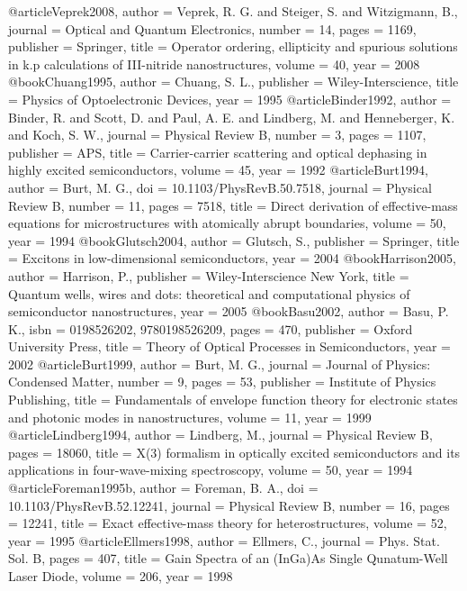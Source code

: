 @article{Veprek2008,
author = {Veprek, R. G. and Steiger, S. and Witzigmann, B.},
journal = {Optical and Quantum Electronics},
number = {14},
pages = {1169},
publisher = {Springer},
title = {{Operator ordering, ellipticity and spurious solutions in k.p calculations of III-nitride nanostructures}},
volume = {40},
year = {2008}
}
@book{Chuang1995,
author = {Chuang, S. L.},
publisher = {Wiley-Interscience},
title = {{Physics of Optoelectronic Devices}},
year = {1995}
}
@article{Binder1992,
author = {Binder, R. and Scott, D. and Paul, A. E. and Lindberg, M. and Henneberger, K. and Koch, S. W.},
journal = {Physical Review B},
number = {3},
pages = {1107},
publisher = {APS},
title = {{Carrier-carrier scattering and optical dephasing in highly excited semiconductors}},
volume = {45},
year = {1992}
}
@article{Burt1994,
author = {Burt, M. G.},
doi = {10.1103/PhysRevB.50.7518},
journal = {Physical Review B},
number = {11},
pages = {7518},
title = {{Direct derivation of effective-mass equations for microstructures with atomically abrupt boundaries}},
volume = {50},
year = {1994}
}
@book{Glutsch2004,
author = {Glutsch, S.},
publisher = {Springer},
title = {{Excitons in low-dimensional semiconductors}},
year = {2004}
}
@book{Harrison2005,
author = {Harrison, P.},
publisher = {Wiley-Interscience New York},
title = {{Quantum wells, wires and dots: theoretical and computational physics of semiconductor nanostructures}},
year = {2005}
}
@book{Basu2002,
author = {Basu, P. K.},
isbn = {0198526202, 9780198526209},
pages = {470},
publisher = {Oxford University Press},
title = {{Theory of Optical Processes in Semiconductors}},
year = {2002}
}
@article{Burt1999,
author = {Burt, M. G.},
journal = {Journal of Physics: Condensed Matter},
number = {9},
pages = {53},
publisher = {Institute of Physics Publishing},
title = {{Fundamentals of envelope function theory for electronic states and photonic modes in nanostructures}},
volume = {11},
year = {1999}
}
@article{Lindberg1994,
author = {Lindberg, M.},
journal = {Physical Review B},
pages = {18060},
title = {{X(3) formalism in optically excited semiconductors and its applications in four-wave-mixing spectroscopy}},
volume = {50},
year = {1994}
}
@article{Foreman1995b,
author = {Foreman, B. A.},
doi = {10.1103/PhysRevB.52.12241},
journal = {Physical Review B},
number = {16},
pages = {12241},
title = {{Exact effective-mass theory for heterostructures}},
volume = {52},
year = {1995}
}
@article{Ellmers1998,
author = {Ellmers, C.},
journal = {Phys. Stat. Sol. B},
pages = {407},
title = {{Gain Spectra of an (InGa)As Single Qunatum-Well Laser Diode}},
volume = {206},
year = {1998}
}
